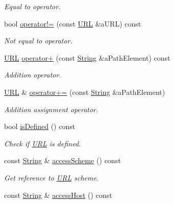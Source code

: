 \begin{DoxyCompactItemize}
\begin{DoxyCompactList}\small\item\em Equal to operator. \end{DoxyCompactList}\item 
bool \hyperlink{classlibrary_1_1io_1_1_u_r_l_a821743d11216826fa475d9b87f37e6cb}{operator!=} (const \hyperlink{classlibrary_1_1io_1_1_u_r_l}{U\+RL} \&a\+U\+RL) const
\begin{DoxyCompactList}\small\item\em Not equal to operator. \end{DoxyCompactList}\item 
\hyperlink{classlibrary_1_1io_1_1_u_r_l}{U\+RL} \hyperlink{classlibrary_1_1io_1_1_u_r_l_a2c82adf72f893fed983610e4cba0b42f}{operator+} (const \hyperlink{namespacelibrary_1_1io_a7469b45835a4421045db344d6a5a1f85}{String} \&a\+Path\+Element) const
\begin{DoxyCompactList}\small\item\em Addition operator. \end{DoxyCompactList}\item 
\hyperlink{classlibrary_1_1io_1_1_u_r_l}{U\+RL} \& \hyperlink{classlibrary_1_1io_1_1_u_r_l_ab93de936ef4e87658902051638d9f0a9}{operator+=} (const \hyperlink{namespacelibrary_1_1io_a7469b45835a4421045db344d6a5a1f85}{String} \&a\+Path\+Element)
\begin{DoxyCompactList}\small\item\em Addition assignment operator. \end{DoxyCompactList}\item 
bool \hyperlink{classlibrary_1_1io_1_1_u_r_l_af0f1c5720acae0e2bd71404a35199546}{is\+Defined} () const
\begin{DoxyCompactList}\small\item\em Check if \hyperlink{classlibrary_1_1io_1_1_u_r_l}{U\+RL} is defined. \end{DoxyCompactList}\item 
const \hyperlink{namespacelibrary_1_1io_a7469b45835a4421045db344d6a5a1f85}{String} \& \hyperlink{classlibrary_1_1io_1_1_u_r_l_a017a872b7f1617d67b0e9f032be24173}{access\+Scheme} () const
\begin{DoxyCompactList}\small\item\em Get reference to \hyperlink{classlibrary_1_1io_1_1_u_r_l}{U\+RL} scheme. \end{DoxyCompactList}\item 
const \hyperlink{namespacelibrary_1_1io_a7469b45835a4421045db344d6a5a1f85}{String} \& \hyperlink{classlibrary_1_1io_1_1_u_r_l_a14d80cd2a42f1337bdaf68cfcb84d8cf}{access\+Host} () const

\end{DoxyCompactItemize}
